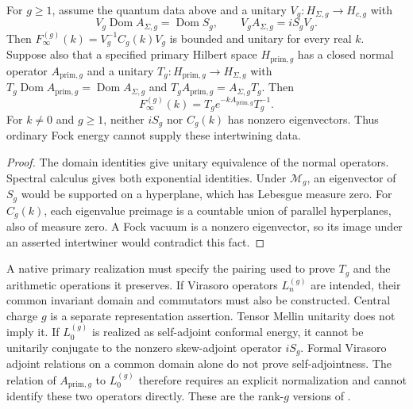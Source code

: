 \begin{theorem}
\label{v4-arith:w9-r6:thm:virasoro-conjugacy-g}
For $g\ge1$, assume the quantum data above and a unitary
\(V_g:H_{\Sigma,g}\to H_{c,g}\) with
\[
 V_g\operatorname{Dom}A_{\Sigma,g}=\operatorname{Dom}S_g,
 \qquad V_g A_{\Sigma,g}=iS_gV_g.
\]
Then \(F^{(g)}_\infty(k)=V_g^{-1}C_g(k)V_g\) is bounded and unitary
for every real \(k\).
Suppose also that a specified primary Hilbert space \(H_{\mathrm{prim},g}\)
has a closed normal operator \(A_{\mathrm{prim},g}\) and a unitary
\(T_g:H_{\mathrm{prim},g}\to H_{\Sigma,g}\) with
\(T_g\operatorname{Dom}A_{\mathrm{prim},g}=\operatorname{Dom}A_{\Sigma,g}\)
and \(T_gA_{\mathrm{prim},g}=A_{\Sigma,g}T_g\). Then
\begin{equation}
 F^{(g)}_\infty(k)=T_g e^{-kA_{\mathrm{prim},g}}T_g^{-1}.
 \label{v4-arith:w9-r6:eq:virasoro-conjugacy-g}
\end{equation}
For \(k\ne0\) and \(g\ge1\), neither \(iS_g\) nor \(C_g(k)\)
has nonzero eigenvectors. Thus ordinary Fock energy cannot supply
these intertwining data.
\end{theorem}
\begin{proof}
The domain identities give unitary equivalence of the normal
operators. Spectral calculus gives both exponential identities.
Under \(\mathcal M_g\), an eigenvector of \(S_g\) would be supported
on a hyperplane, which has Lebesgue measure zero. For \(C_g(k)\),
each eigenvalue preimage is a countable union of parallel hyperplanes,
also of measure zero. A Fock vacuum is a nonzero eigenvector,
so its image under an asserted intertwiner would contradict this fact.
\end{proof}

A native primary realization must specify the pairing used to prove
\(T_g\) and the arithmetic operations it preserves.
If Virasoro operators \(L_n^{(g)}\) are intended, their common
invariant domain and commutators must also be constructed. Central
charge \(g\) is a separate representation assertion. Tensor Mellin
unitarity does not imply it. If \(L_0^{(g)}\) is realized as self-adjoint conformal energy,
it cannot be unitarily conjugate to the nonzero skew-adjoint
operator \(iS_g\). Formal Virasoro adjoint relations on a common
domain alone do not prove self-adjointness.
The relation of \(A_{\mathrm{prim},g}\) to \(L_0^{(g)}\) therefore
requires an explicit normalization and cannot identify these two
operators directly. These are the rank-\(g\) versions of
.

